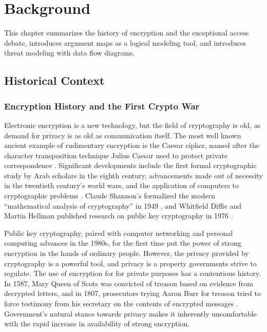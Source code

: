 \chapter{Background}
\label{chap-background}

This chapter summarizes the history of encryption and the exceptional access debate, introduces argument maps as a
logical modeling tool, and introduces threat modeling with data flow diagrams.

\section{Historical Context}
\label{sec-history}

\subsection{Encryption History and the First Crypto War}

Electronic encryption is a new technology, but the field of cryptography is old, as demand for privacy is as old as
communication itself. The most well known ancient example of rudimentary encryption is the Caesar cipher, named after
the character transposition technique Julius Caesar used to protect private correspondence
\cite{luciano_cryptology_1987}. Significant developments include the first formal cryptographic study by Arab scholars
in the eighth century, advancements made out of necessity in the twentieth century's world wars, and the application of
computers to cryptographic problems \cite{kahn_codebreakers_1996}. Claude Shannon's formalized the modern ``mathematical
analysis of cryptography'' in 1949 \cite{shannon_communication_1949}, and Whitfield Diffie and Martin Hellman published
research on public key cryptography in 1976 \cite{diffie_new_1976}.

Public key cryptography, paired with computer networking and personal computing advances in the 1980s, for the first
time put the power of strong encryption in the hands of ordinary people. However, the privacy provided by cryptography
is a powerful tool, and privacy is a property governments strive to regulate. The use of encryption for for private
purposes has a contentious history. In 1587, Mary Queen of Scots was convicted of treason based on evidence from
decrypted letters, and in 1807, prosecutors trying Aaron Burr for treason tried to force testimony from his secretary on
the contents of encrypted messages \cite{kerr_encryption_2017}. Government's natural stance towards privacy makes it
inherently uncomfortable with the rapid increase in availability of strong encryption.

